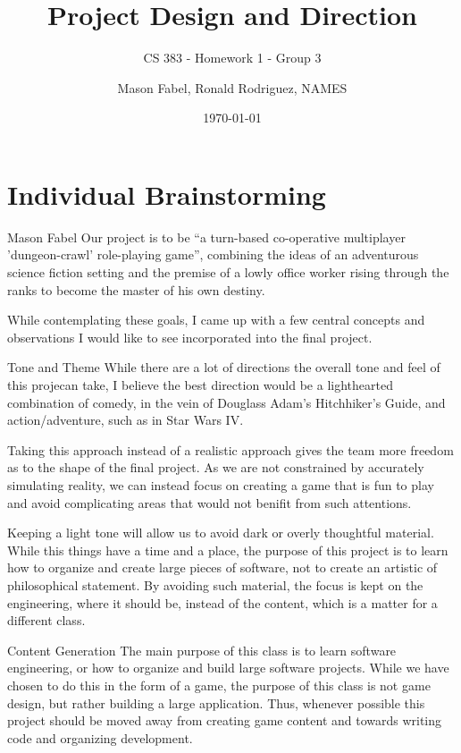 \documentclass[12pt]{report}
\title{Project Design and Direction}
\subtitle{CS 383 - Homework 1 - Group 3}
\author{Mason Fabel, Ronald Rodriguez, NAMES} %
\date{\today}
\begin{document}
\maketitle

\chapter{Individual Brainstorming}


\begin{section}{Mason Fabel}
Our project is to be ``a turn-based co-operative multiplayer
'dungeon-crawl' role-playing game'', combining the ideas of an adventurous
science fiction setting and the premise of a lowly office worker rising
through the ranks to become the master of his own destiny.

While contemplating these goals, I came up with a few central concepts and
observations I would like to see incorporated into the final project.

\begin{subsection}{Tone and Theme}
While there are a lot of directions the overall tone and feel of this projecan take, I believe the best direction would be a lighthearted combination of comedy, in the vein of Douglass Adam's Hitchhiker's Guide, and
action/adventure, such as in Star Wars IV.

Taking this approach instead of a realistic approach gives the team more
freedom as to the shape of the final project. As we are not constrained by
accurately simulating reality, we can instead focus on creating a game that
is fun to play and avoid complicating areas that would not benifit from
such attentions.

Keeping a light tone will allow us to avoid dark or overly thoughtful
material. While this things have a time and a place, the purpose
of this project is to learn how to organize and create large pieces of
software, not to create an artistic of philosophical statement. By avoiding
such material, the focus is kept on the engineering, where it should be,
instead of the content, which is a matter for a different class.
\end{subsection}

\begin{subsection}{Content Generation}
The main purpose of this class is to learn software engineering, or how
to organize and build large software projects. While we have chosen to do
this in the form of a game, the purpose of this class is not game design,
but rather building a large application. Thus, whenever possible this
project should be moved away from creating game content and towards writing
code and organizing development.


\end{subsection}
\end{section}
\end{document}
